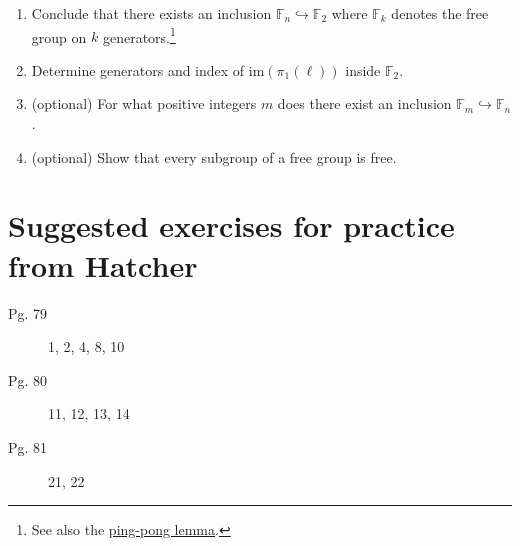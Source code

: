 \documentclass{article}
\begin{document}
\begin{enumerate}
\begin{enumerate}
  \item Conclude that there exists an
    inclusion $\mathbb{F}_n \hookrightarrow \mathbb{F}_2$ where $\mathbb{F}_k$ denotes the
    free group on $k$ generators.\footnote{See
      also the \href{https://en.wikipedia.org/wiki/Ping-pong_lemma}{ping-pong lemma}.}
  \item Determine generators and index of $\mathrm{im}(\pi_1(\ell))$ inside
    $\mathbb{F}_2$.
  \item (optional) For what positive integers $m$ does there exist an inclusion
    $\mathbb{F}_m \hookrightarrow \mathbb{F}_n$.
  \item (optional) Show that every subgroup of a free group is free.  \end{enumerate}
\end{enumerate}

\newpage
\section*{Suggested exercises for practice from Hatcher}

\begin{description}
\item[Pg. 79] 1, 2, 4, 8, 10
\item[Pg. 80] 11, 12, 13, 14
\item[Pg. 81] 21, 22
\end{description}
\end{document}

